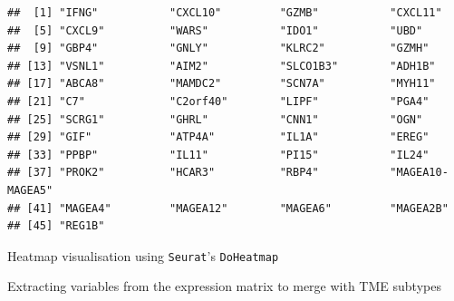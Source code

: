 \documentclass[
  12pt,
]{book}
\newenvironment{Shaded}{\begin{snugshade}}{\end{snugshade}}
\newcommand{\AttributeTok}[1]{\textcolor[rgb]{0.13,0.29,0.53}{#1}}
\newcommand{\CommentTok}[1]{\textcolor[rgb]{0.56,0.35,0.01}{\textit{#1}}}
\newcommand{\ConstantTok}[1]{\textcolor[rgb]{0.56,0.35,0.01}{#1}}
\newcommand{\DecValTok}[1]{\textcolor[rgb]{0.00,0.00,0.81}{#1}}
\newcommand{\FunctionTok}[1]{\textcolor[rgb]{0.13,0.29,0.53}{\textbf{#1}}}
\newcommand{\NormalTok}[1]{#1}
\newcommand{\OtherTok}[1]{\textcolor[rgb]{0.56,0.35,0.01}{#1}}
\newcommand{\SpecialCharTok}[1]{\textcolor[rgb]{0.81,0.36,0.00}{\textbf{#1}}}
\newcommand{\StringTok}[1]{\textcolor[rgb]{0.31,0.60,0.02}{#1}}
\begin{document}
\begin{verbatim}
##  [1] "IFNG"           "CXCL10"         "GZMB"           "CXCL11"        
##  [5] "CXCL9"          "WARS"           "IDO1"           "UBD"           
##  [9] "GBP4"           "GNLY"           "KLRC2"          "GZMH"          
## [13] "VSNL1"          "AIM2"           "SLCO1B3"        "ADH1B"         
## [17] "ABCA8"          "MAMDC2"         "SCN7A"          "MYH11"         
## [21] "C7"             "C2orf40"        "LIPF"           "PGA4"          
## [25] "SCRG1"          "GHRL"           "CNN1"           "OGN"           
## [29] "GIF"            "ATP4A"          "IL1A"           "EREG"          
## [33] "PPBP"           "IL11"           "PI15"           "IL24"          
## [37] "PROK2"          "HCAR3"          "RBP4"           "MAGEA10-MAGEA5"
## [41] "MAGEA4"         "MAGEA12"        "MAGEA6"         "MAGEA2B"       
## [45] "REG1B"
\end{verbatim}

Heatmap visualisation using \texttt{Seurat}'s \texttt{DoHeatmap}

\begin{Shaded}
\end{Shaded}

Extracting variables from the expression matrix to merge with TME subtypes

\begin{Shaded}
\end{Shaded}
\end{document}
